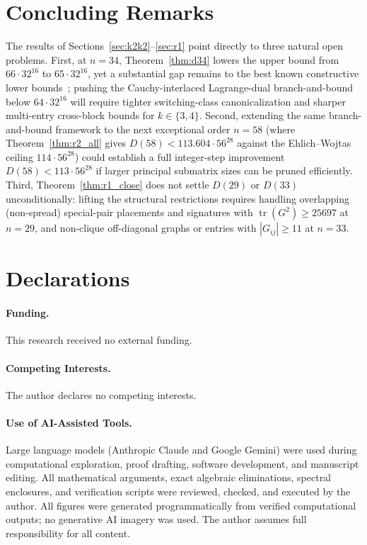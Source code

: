 \documentclass[11pt]{article}
\theoremstyle{remark}
\newcommand{\tr}{\operatorname{tr}}
\begin{document}
\section{Concluding Remarks}\label{sec:concluding}

The results of Sections~\ref{sec:k2k2}--\ref{sec:r1} point directly to three natural open problems. First, at $n = 34$, Theorem~\ref{thm:d34} lowers the upper bound from $66 \cdot 32^{16}$ to $65 \cdot 32^{16}$, yet a substantial gap remains to the best known constructive lower bounds~\cite{orrick2003,browne2021survey}; pushing the Cauchy-interlaced Lagrange-dual branch-and-bound below $64 \cdot 32^{16}$ will require tighter switching-class canonicalization and sharper multi-entry cross-block bounds for $k \in \{3, 4\}$. Second, extending the same branch-and-bound framework to the next exceptional order $n = 58$ (where Theorem~\ref{thm:r2_all} gives $D(58) < 113.604 \cdot 56^{28}$ against the Ehlich--Wojtas ceiling $114 \cdot 56^{28}$) could establish a full integer-step improvement $D(58) < 113 \cdot 56^{28}$ if larger principal submatrix sizes can be pruned efficiently. Third, Theorem~\ref{thm:r1_close} does not settle $D(29)$ or $D(33)$ unconditionally: lifting the structural restrictions requires handling overlapping (non-spread) special-pair placements and signatures with $\tr(G^2) \ge 25697$ at $n = 29$, and non-clique off-diagonal graphs or entries with $|G_{ij}| \ge 11$ at $n = 33$.

\section*{Declarations}

\paragraph{Funding.} This research received no external funding.

\paragraph{Competing Interests.} The author declares no competing interests.

\paragraph{Use of AI-Assisted Tools.} Large language models (Anthropic Claude and Google Gemini) were used during computational exploration, proof drafting, software development, and manuscript editing. All mathematical arguments, exact algebraic eliminations, spectral enclosures, and verification scripts were reviewed, checked, and executed by the author. All figures were generated programmatically from verified computational outputs; no generative AI imagery was used. The author assumes full responsibility for all content.
\end{document}
